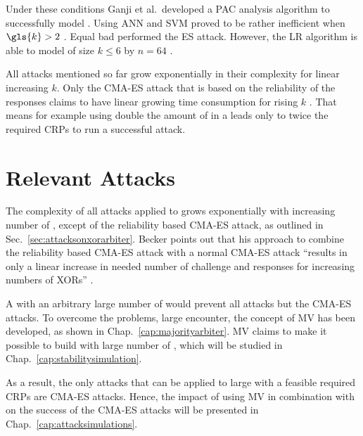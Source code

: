 Under these conditions Ganji et al.\ developed a \ac{PAC} analysis algorithm to successfully model \xpufs \cite{Ganji2015WhyPUFs}.
Using \ac{ANN} and \ac{SVM} proved to be rather inefficient when $\gls{k} > 2$ \cite{Hospodar2012MachineUsability}.
Equal bad performed the \ac{ES} attack.
However, the \ac{LR} algorithm is able to model \xpufs of size $k \le 6$ by $n = 64$ \cite{Ruhrmair2010ModelingFunctions}.

All attacks mentioned so far grow exponentially in their complexity for linear increasing $k$.
Only the \ac{CMA-ES} attack that is based on the reliability of the responses claims to have linear growing time consumption for rising $k$ \cite{Becker2015ThePUFs}.
That means for example using double the amount of \apufs in a \xpufs leads only to twice the required \acp{CRP} to run a successful attack.


\section{Relevant Attacks}
\label{sec:essentialattacks}

The complexity of all attacks applied to \xpufs grows exponentially with increasing number of \apuf, except of the reliability based \ac{CMA-ES} attack, as outlined in Sec.\ \ref{sec:attacksonxorarbiter}.
Becker points out that his approach to combine the reliability based \ac{CMA-ES} attack with a normal \ac{CMA-ES} attack ``results in only a linear increase in needed number of challenge and responses for increasing numbers of XORs'' \cite{Becker2015ThePUFs}.

A \xpuf with an arbitrary large number of \apufs would prevent all attacks but the \ac{CMA-ES} attacks.
To overcome the problems, large \xpufs encounter, the concept of \ac{MV} has been developed, as shown in Chap.\ \ref{cap:majorityarbiter}.
\ac{MV} claims to make it possible to build \xpufs with large number of \apufs, which will be studied in Chap.\ \ref{cap:stabilitysimulation}.

As a result, the only attacks that can be applied to large \xpufs with a feasible required \acp{CRP} are \ac{CMA-ES} attacks.
Hence, the impact of using \ac{MV} in combination with \apufs on the success of the \ac{CMA-ES} attacks will be presented in Chap.\ \ref{cap:attacksimulations}.

